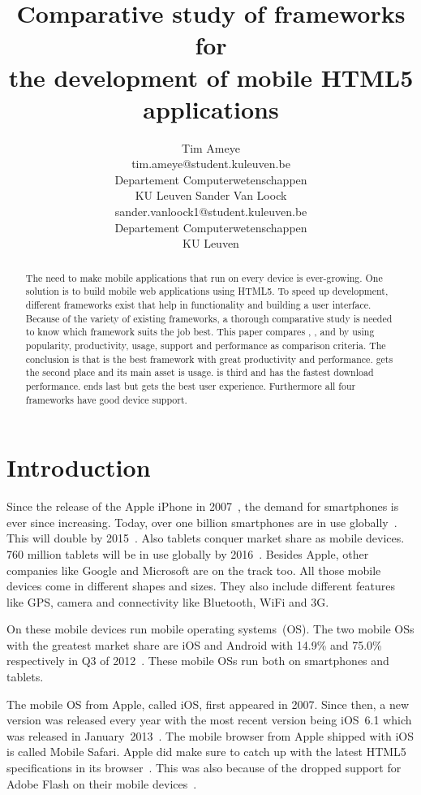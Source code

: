 \documentclass[a4paper]{artikel3}
\title{Comparative study of frameworks for \\ the development of mobile HTML5 applications}
\author{Tim Ameye \\ tim.ameye@student.kuleuven.be \\ Departement Computerwetenschappen \\ KU Leuven \And Sander Van Loock \\ sander.vanloock1@student.kuleuven.be \\ Departement Computerwetenschappen \\ KU Leuven}
\begin{document}
\maketitle

\begin{abstract}
The need to make mobile applications that run on every device is ever-growing.
One solution is to build mobile web applications using HTML5.
To speed up development, different frameworks exist that help in functionality and building a user interface.
Because of the variety of existing frameworks, a thorough comparative study is needed to know which framework suits the job best.
This paper compares \st{}, \jqm{}, \kendo{} and \lungo{} by using popularity, productivity, usage, support and performance as comparison criteria. 
The conclusion is that \jqm{} is the best framework with great productivity and performance. 
\kendo{} gets the second place and its main asset is usage.
\lungo{} is third and has the fastest download performance.
\st{} ends last but gets the best user experience.
Furthermore all four frameworks have good device support.
\end{abstract}


\section{Introduction} %
\label{sec:introduction}
Since the release of the Apple iPhone in 2007~\cite{David2011}, the demand for smartphones is ever since increasing. 
Today, over one billion smartphones are in use globally~\cite{Yang2012}.
This will double by 2015~\cite{Gillett2012}.
Also tablets conquer market share as mobile devices.
760 million tablets will be in use globally by 2016~\cite{Gillett2012}.
Besides Apple, other companies like Google and Microsoft are on the track too.
All those mobile devices come in different shapes and sizes.
They also include different features like GPS, camera and connectivity like Bluetooth, WiFi and 3G.

On these mobile devices run mobile operating systems~(OS). The two mobile OSs with the greatest market share are iOS and Android with 14.9\% and 75.0\% respectively in Q3 of 2012~\cite{Protalinski2012}.
These mobile OSs run both on smartphones and tablets.

The mobile OS from Apple, called iOS, first appeared in 2007.
Since then, a new version was released every year with the most recent version being iOS~6.1 which was released in January~2013~\cite{Deitel2012,PhilDutson2012,Apple2013}.
The mobile browser from Apple shipped with iOS is called Mobile Safari.
Apple did make sure to catch up with the latest HTML5 specifications in its browser~\cite{Hales2012}.
This was also because of the dropped support for Adobe Flash on their mobile devices~\cite{Jobs2010}.
\end{document}
